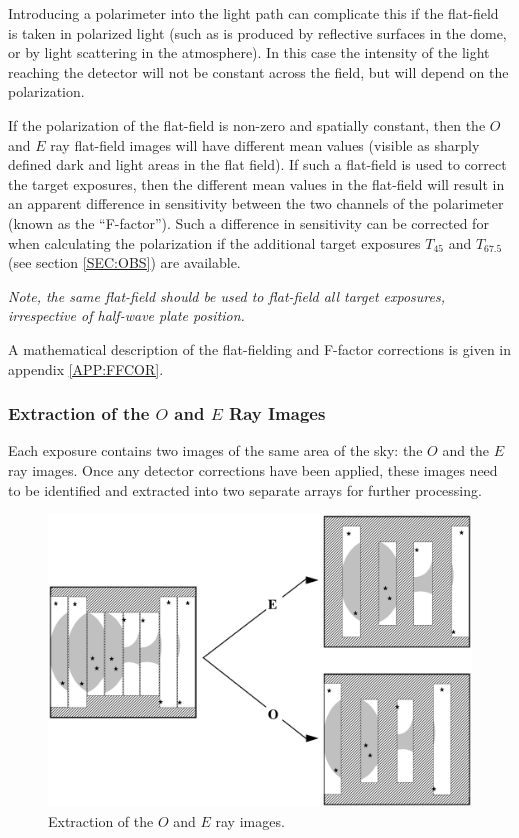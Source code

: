 \documentclass[twoside,11pt]{article}
\newcommand{\hyperref}[4]{#2\ref{#4}#3}
\newenvironment{latexonly}{}{}
\renewcommand{\_}{\texttt{\symbol{95}}}
\begin{document}
Introducing a polarimeter into the light path can complicate this if the
flat-field is taken in polarized light (such as is produced by reflective
surfaces in the dome, or by light scattering in the atmosphere). In this
case the intensity of the light reaching the detector will not be
constant across the field, but will depend on the polarization. 

If the polarization of the flat-field is non-zero and spatially constant,
then the $O$ and $E$ ray flat-field images will have different mean
values (visible as sharply defined dark and light areas in the flat
field). If such a flat-field is used to correct the target exposures,
then the different mean values in the flat-field will result in an
apparent difference in sensitivity between the two channels of the
polarimeter (known as the ``F-factor''). Such a difference in sensitivity
can be corrected for when calculating the polarization if the additional
target exposures \hyperref{$T_{45}$ and $T_{67.5}$}{$T_{45}$ and
$T_{67.5}$ (see section }{)}{SEC:OBS} are available. 

\emph{Note, the same flat-field should be used to flat-field all target
exposures, irrespective of half-wave plate position.}

A mathematical description of the flat-fielding and F-factor corrections
is given \hyperref{here}{in appendix }{}{APP:FFCOR}.

\subsubsection{Extraction of the $O$ and $E$ Ray Images}
Each exposure contains two images of the same area of the sky: the $O$
and the $E$ ray images. Once any detector corrections have been applied,
these images need to be identified and extracted into two separate arrays for
further processing.

\begin{latexonly}
  \vspace{5mm}
  \begin{figure}[htbp]
  \begin{center}
  \includegraphics[clip,scale=0.5]{sun223_figures/extract.eps}
  \caption{Extraction of the $O$ and $E$ ray images.}
  \label{fig:extract}
  \end{center}
  \end{figure}
\end{latexonly}
\end{document}
